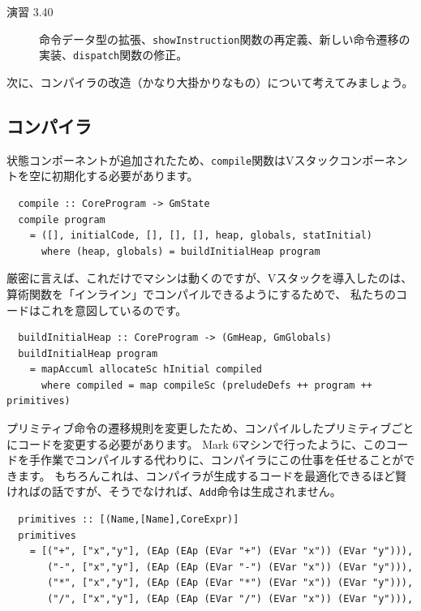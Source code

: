 \documentclass{jbook}
\begin{document}
\begin{description}
	\item[演習 3.40] 命令データ型の拡張、\texttt{showInstruction}関数の再定義、新しい命令遷移の実装、\texttt{dispatch}関数の修正。
\end{description}

次に、コンパイラの改造（かなり大掛かりなもの）について考えてみましょう。

\subsection{コンパイラ}

状態コンポーネントが追加されたため、\texttt{compile}関数はVスタックコンポーネントを空に初期化する必要があります。

\begin{verbatim}
  compile :: CoreProgram -> GmState
  compile program
    = ([], initialCode, [], [], [], heap, globals, statInitial)
      where (heap, globals) = buildInitialHeap program
\end{verbatim}

厳密に言えば、これだけでマシンは動くのですが、Vスタックを導入したのは、
算術関数を「インライン」でコンパイルできるようにするためで、
私たちのコードはこれを意図しているのです。

\begin{verbatim}
  buildInitialHeap :: CoreProgram -> (GmHeap, GmGlobals)
  buildInitialHeap program
    = mapAccuml allocateSc hInitial compiled
      where compiled = map compileSc (preludeDefs ++ program ++ primitives)
\end{verbatim}

プリミティブ命令の遷移規則を変更したため、コンパイルしたプリミティブごとにコードを変更する必要があります。
Mark 6マシンで行ったように、このコードを手作業でコンパイルする代わりに、コンパイラにこの仕事を任せることができます。
もちろんこれは、コンパイラが生成するコードを最適化できるほど賢ければの話ですが、そうでなければ、\texttt{Add}命令は生成されません。

\begin{verbatim}
  primitives :: [(Name,[Name],CoreExpr)]
  primitives
    = [("+", ["x","y"], (EAp (EAp (EVar "+") (EVar "x")) (EVar "y"))),
       ("-", ["x","y"], (EAp (EAp (EVar "-") (EVar "x")) (EVar "y"))),
       ("*", ["x","y"], (EAp (EAp (EVar "*") (EVar "x")) (EVar "y"))),
       ("/", ["x","y"], (EAp (EAp (EVar "/") (EVar "x")) (EVar "y"))),
\end{verbatim}
\end{document}
